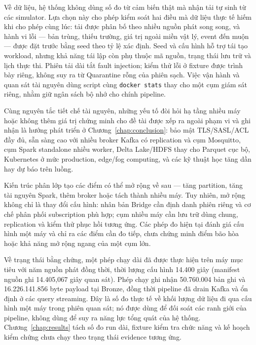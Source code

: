 Về dữ liệu, hệ thống không dùng số đo từ cảm biến thật mà nhận tải tự
sinh từ các simulator. Lựa chọn này cho phép kiểm soát hai điều mà dữ
liệu thực tế hiếm khi cho phép cùng lúc: tải được phân bố theo nhiều
nguồn phát song song, và hành vi lỗi --- bản trùng, thiếu trường, giá trị
ngoài miền vật lý, event đến muộn --- được đặt trước bằng seed theo tỷ lệ
xác định. Seed và cấu hình hỗ trợ tái tạo workload, nhưng khả năng tái lập còn phụ
thuộc mã nguồn, trạng thái lưu trữ và lịch thực thi. Phiên tải dài tắt fault
injection; kiểm thử lỗi ở fixture được trình bày riêng, không suy ra từ
Quarantine rỗng của phiên sạch. Việc vận hành và quan sát tài nguyên
dùng script cùng \texttt{docker stats} thay cho một cụm giám sát riêng,
nhằm giữ ngân sách bộ nhớ cho chính pipeline.

Cùng nguyên tắc tiết chế tài nguyên, những yếu tố đòi hỏi hạ tầng nhiều
máy hoặc không thêm giá trị chứng minh cho đề tài được xếp ra ngoài
phạm vi và ghi nhận là hướng phát triển ở Chương~\ref{chap:conclusion}:
bảo mật TLS/SASL/ACL đầy đủ, sẵn sàng cao với nhiều broker Kafka có
replication và cụm Mosquitto, cụm Spark standalone nhiều worker, Delta
Lake/HDFS thay cho Parquet cục bộ, Kubernetes ở mức production, edge/fog
computing, và các kỹ thuật học tăng dần hay dự báo trên luồng.

Kiến trúc phân lớp tạo các điểm có thể mở rộng về sau --- tăng partition,
tăng tài nguyên Spark, thêm broker hoặc tách thành nhiều máy. Tuy nhiên,
mở rộng không chỉ là thay đổi cấu hình: nhân bản Bridge cần định danh
phiên riêng và cơ chế phân phối subscription phù hợp; cụm nhiều máy cần
lưu trữ dùng chung, replication và kiểm thử phục hồi tương ứng. Các phép
đo hiện tại đánh giá cấu hình một máy và chỉ ra các điểm cần đo tiếp,
chưa chứng minh điểm bão hòa hoặc khả năng mở rộng ngang của một cụm lớn.

Về trạng thái bằng chứng, một phép chạy dài đã được thực hiện trên máy mục
tiêu với năm nguồn phát đồng thời, thời lượng cấu hình 14.400 giây (manifest
nguồn ghi 14.405,067 giây quan sát). Phép chạy ghi nhận
50.760.004 bản ghi và 16.226.141.856 byte payload tại Bronze, đồng thời
pipeline đã drain Kafka và ổn định ở các query streaming. Đây là số đo thực
tế về khối lượng dữ liệu đi qua cấu hình một máy trong phiên quan sát; nó
được dùng để đối soát các ranh giới của pipeline, không dùng để suy ra năng
lực tổng quát của hệ thống. Chương~\ref{chap:results} tách số đo run dài,
fixture kiểm tra chức năng và kế hoạch kiểm chứng chưa chạy theo trạng thái
evidence tương ứng.

